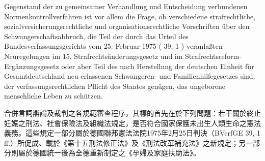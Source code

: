 \documentclass[12pt]{article}
\begin{document}
\begin{sourcepara}[title={原文理由 A. 開頭}]
Gegenstand der zu gemeinsamer Verhandlung und Entscheidung verbundenen Normenkontrollverfahren ist vor allem die Frage, ob verschiedene strafrechtliche, sozialversicherungsrechtliche und organisationsrechtliche Vorschriften über den Schwangerschaftsabbruch, die Teil der durch das Urteil des Bundesverfassungsgerichts vom 25. Februar 1975 (\abbrBVerfGE{} 39, 1 \abbrFF{}) veranlaßten Neuregelungen im 15. Strafrechtsänderungsgesetz und im Strafrechtsreform-Ergänzungsgesetz oder aber Teil des nach Herstellung der deutschen Einheit für Gesamtdeutschland neu erlassenen Schwangeren- und Familienhilfegesetzes sind, der verfassungsrechtlichen Pflicht des Staates genügen, das ungeborene menschliche Leben zu schützen.
\end{sourcepara}
\begin{transpara}
合併言詞辯論及裁判之各規範審查程序，其標的首先在於下列問題：若干關於終止妊娠之刑法、社會保險法及組織法規定，是否符合國家保護未出生人類生命之憲法義務。這些規定一部分屬於德國聯邦憲法法院1975年2月25日判決（BVerfGE 39, 1 ff.）所促成、載於《第十五刑法修正法》及《刑法改革補充法》之新規定；另一部分則屬於德國統一後為全德重新制定之《孕婦及家庭扶助法》。
\end{transpara}

\end{document}
